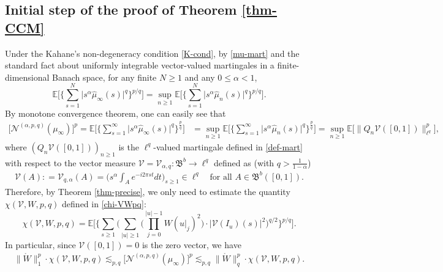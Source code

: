 \documentclass[12pt]{amsart}
\theoremstyle{definition}
\theoremstyle{remark}
\newcommand{\E}{\mathbb{E}}
\newcommand{\NQ}{\mathcal{N}^{(\alpha, p, q)}}
\numberwithin{equation}{section}
\begin{document}
\subsection{Initial step of the proof of Theorem \ref{thm-CCM}}

Under the Kahane's non-degeneracy condition \eqref{K-cond}, by  \eqref{mu-mart} and the standard fact about uniformly integrable vector-valued martingales in a finite-dimensional Banach space, for any finite  $N\ge 1$ and any $0\le \alpha<1$, 
\[
\E\Big[\Big\{\sum_{s =  1}^N \big|s^{\alpha} \widehat{\mu}_\infty (s)\big|^q\Big\}^{p/q}\Big]  = \sup_{n\ge 1}  \E\Big[\Big\{\sum_{s =  1}^N \big|s^{\alpha} \widehat{\mu}_n(s)\big|^q\Big\}^{p/q}\Big]. 
\]
By monotone convergence theorem, one can  easily see that
\begin{align*}
\big[\NQ(\mu_\infty)\big]^p =  \E\Big[\Big\{\sum_{s =  1}^\infty \big|s^{\alpha} \widehat{\mu}_\infty(s)\big|^q\Big\}^{\frac{p}{q}}\Big]  & = \sup_{n\ge 1}  \E\Big[\Big\{\sum_{s =  1}^\infty \big|s^{\alpha} \widehat{\mu}_n(s)\big|^q\Big\}^{\frac{p}{q}}\Big] 
 =  \sup_{n\ge 1} \E \Big[ \big  \| Q_n\mathcal{V}([0,1])\big\|_{\ell^q}^p \Big], 
\end{align*}
where  $(Q_n\mathcal{V}([0,1]))_{n\ge 1}$ is the $\ell^q$-valued martingale  defined in \eqref{def-mart} with respect to  the vector measure  $\mathcal{V} = \mathcal{V}_{\alpha, q}: \mathfrak{B}^b \rightarrow \ell^q$ defined as (with $q> \frac{1}{1- \alpha}$)
\begin{align}\label{def-nuq}
\mathcal{V}(A): = \mathcal{V}_{q,\alpha}(A) =   \Big( s^\alpha \int_{A}e^{-i 2\pi st} dt \Big)_{s\ge 1} \in \ell^q \quad \text{for all $A\in \mathfrak{B}^b([0,1])$}.
\end{align}
Therefore, by Theorem \ref{thm-precise}, we only need to estimate the quantity $\chi(\mathcal{V}, W, p, q)$ defined in \eqref{chi-VWpq}: 
\[
\chi(\mathcal{V}, W, p, q) = \E \Big[   \Big\{     \sum_{s \ge 1}       \Big(   \sum_{|u|\ge 1}    \Big(  \prod_{j=0}^{|u|-1} W(u|_j)^2 \Big)   \cdot  \big| \mathcal{V}(I_u)(s)  \big|^2    \Big)^{q/2}  \Big\}^{p/q}\Big]. 
\]
In particular, since $\mathcal{V}([0,1])=0$ is the zero vector,  we have 
\begin{align}\label{2-side-zero}
 \|\mathring{W}\|_1^p \cdot  \chi(\mathcal{V}, W, p, q) \lesssim_{p,q}       \big[ \NQ(\mu_\infty)\big]^p    \lesssim_{p,q}   \|\mathring{W}\|_q^p \cdot \chi(\mathcal{V}, W, p, q). 
\end{align}
 
\end{document}
